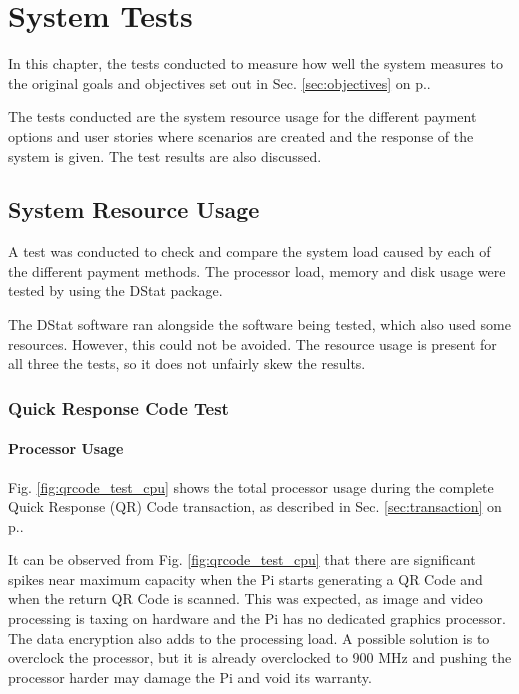 \chapter{System Tests}
\label{chap:6}

In this chapter, the tests  conducted to measure how well the system measures to the
original goals and objectives set out in Sec. \ref{sec:objectives} on p.\pageref{sec:objectives}.

The tests conducted are the system resource usage for the different payment
options and user stories where scenarios are created and the response of the
system is given. The test results are also discussed. 

\section{System Resource Usage}

A test was conducted to check and compare the system load caused by each of the
different payment methods. The processor load, memory and disk usage were tested
by using the DStat package.

The DStat software ran alongside the software being tested, which also used some
resources. However, this could not be avoided. The resource usage is
present for all three the tests, so it does not unfairly skew the results.

\subsection{Quick Response Code Test}
\label{sec:qr-tests}

\subsubsection{Processor Usage}

Fig. \ref{fig:qrcode_test_cpu} shows the total processor usage during the complete
Quick Response (QR) Code transaction, as described in Sec. \ref{sec:transaction} on
p.\pageref{sec:transaction}.

It can be observed from Fig. \ref{fig:qrcode_test_cpu} that there are significant spikes
near maximum capacity when the Pi starts generating a QR Code and when the return QR Code is scanned. This was expected, as
image and video processing is taxing on hardware and the Pi has no dedicated graphics
processor. The data encryption also adds to the processing load. A possible solution is to
overclock the processor, but it is already overclocked to 900 MHz and pushing the
processor harder may damage the Pi and void its warranty.

